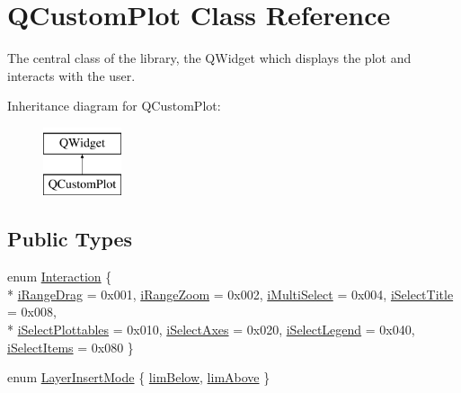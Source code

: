 \hypertarget{classQCustomPlot}{\section{Q\-Custom\-Plot Class Reference}
\label{classQCustomPlot}
}


The central class of the library, the Q\-Widget which displays the plot and interacts with the user.  


Inheritance diagram for Q\-Custom\-Plot\-:\begin{figure}[H]
\begin{center}
\leavevmode
\includegraphics[height=2.000000cm]{classQCustomPlot}
\end{center}
\end{figure}
\subsection*{Public Types}
\begin{DoxyCompactItemize}
\item 
enum \hyperlink{classQCustomPlot_acc82d021129b61e550e36747d2e76d3a}{Interaction} \{ \\*
\hyperlink{classQCustomPlot_acc82d021129b61e550e36747d2e76d3aae5128b3d5d45736c7f109f80beacb8bb}{i\-Range\-Drag} = 0x001, 
\hyperlink{classQCustomPlot_acc82d021129b61e550e36747d2e76d3aa9a4261d5fa24a11bdbdecdc58efcab2f}{i\-Range\-Zoom} = 0x002, 
\hyperlink{classQCustomPlot_acc82d021129b61e550e36747d2e76d3aa53148ccd6a25acf531df229639b7eb3a}{i\-Multi\-Select} = 0x004, 
\hyperlink{classQCustomPlot_acc82d021129b61e550e36747d2e76d3aab149ac43f43d9cacc86be434243acfbf}{i\-Select\-Title} = 0x008, 
\\*
\hyperlink{classQCustomPlot_acc82d021129b61e550e36747d2e76d3aacf8f7cf0b21c32a85d3a72ccd48f0313}{i\-Select\-Plottables} = 0x010, 
\hyperlink{classQCustomPlot_acc82d021129b61e550e36747d2e76d3aa2deb166692b109ab125cb2d2a5e24150}{i\-Select\-Axes} = 0x020, 
\hyperlink{classQCustomPlot_acc82d021129b61e550e36747d2e76d3aa9374fc5a7c88dfd92c951f22c96834f1}{i\-Select\-Legend} = 0x040, 
\hyperlink{classQCustomPlot_acc82d021129b61e550e36747d2e76d3aa2f1c34708a97bc30cc14684fa6cb844d}{i\-Select\-Items} = 0x080
 \}
\item 
enum \hyperlink{classQCustomPlot_a75a8afbe6ef333b1f3d47abb25b9add7}{Layer\-Insert\-Mode} \{ \hyperlink{classQCustomPlot_a75a8afbe6ef333b1f3d47abb25b9add7aee39cf650cd24e68552da0b697ce4a93}{lim\-Below}, 
\hyperlink{classQCustomPlot_a75a8afbe6ef333b1f3d47abb25b9add7a062b0b7825650b432a713c0df6742d41}{lim\-Above}
 \}
\end{DoxyCompactItemize}
